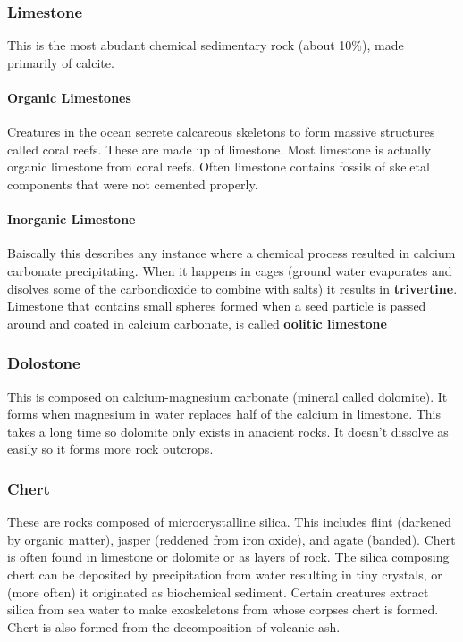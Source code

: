 \documentclass{article}
\begin{document}
\subsubsection*{Limestone} %
\label{sub:limestone}
This is the most abudant chemical sedimentary rock (about 10\%), made primarily of calcite.
\paragraph{Organic Limestones} %
\label{par:organic_limestones}
Creatures in the ocean secrete calcareous skeletons to form massive structures called coral reefs. These are made up of limestone. Most limestone is actually organic limestone from coral reefs. Often limestone contains fossils of skeletal components that were not cemented properly.
\paragraph{Inorganic Limestone} %
\label{par:inorganic_limestone}
Baiscally this describes any instance where a chemical process resulted in calcium carbonate precipitating. When it happens in cages (ground water evaporates and disolves some of the carbondioxide to combine with salts) it results in \textbf{trivertine}. Limestone that contains small spheres formed when a seed particle is passed around and coated in calcium carbonate, is called \textbf{oolitic limestone}

\subsubsection*{Dolostone} %
\label{sub:dolostone}
This is composed on calcium-magnesium carbonate (mineral called dolomite). It forms when magnesium in water replaces half of the calcium in limestone. This takes a long time so dolomite only exists in anacient rocks. It doesn't dissolve as easily so it forms more rock outcrops.

\subsubsection*{Chert} %
\label{sub:chert}
These are rocks composed of microcrystalline silica. This includes flint (darkened by organic matter), jasper (reddened from iron oxide), and agate (banded). Chert is often found in limestone or dolomite or as layers of rock. The silica composing chert can be deposited by precipitation from water resulting in tiny crystals, or (more often) it originated as biochemical sediment. Certain creatures extract silica from sea water to make exoskeletons from whose corpses chert is formed. Chert is also formed from the decomposition of volcanic ash.
\end{document}
